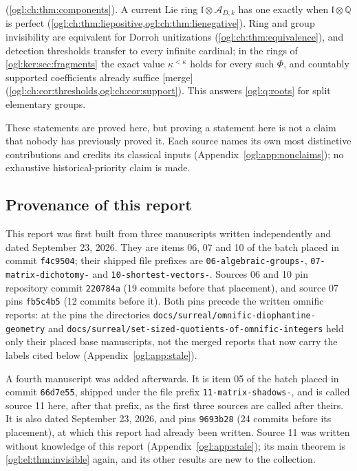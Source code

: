 \documentclass[11pt,oneside]{article}
\numberwithin{equation}{section}
\theoremstyle{definition}
\theoremstyle{remark}
\newcommand{\Q}{\mathbb Q}
\newcommand{\A}{\mathcal A}
\newcommand{\mergetag}{\textup{\textsf{\small[merge]}}}
\newcommand{\fn}[1]{\nolinkurl{#1}}
\begin{document}
\begin{enumerate}[label=\textup{(\arabic*)},leftmargin=*,itemsep=3pt]
(\cref{ogl:ch:thm:components}). A current Lie ring $\mathfrak l\otimes\A_{D,k}$
has one exactly when $\mathfrak l\otimes\Q$ is perfect
(\cref{ogl:ch:thm:liepositive,ogl:ch:thm:lienegative}). Ring and group
invisibility are equivalent for Dorroh unitizations
(\cref{ogl:ch:thm:equivalence}), and detection thresholds transfer to every
infinite cardinal; in the rings of \cref{ogl:ker:sec:fragments} the exact value
$\kappa^{<\kappa}$ holds for every such $\Phi$, and countably supported
coefficients already suffice \mergetag{}
(\cref{ogl:ch:cor:thresholds,ogl:ch:cor:support}). This answers \cref{ogl:q:roots} for split
elementary groups.
\end{enumerate}

These statements are proved here, but proving a statement here is not a claim
that nobody has previously proved it. Each source names its own most
distinctive contributions and credits its classical inputs
(Appendix~\ref{ogl:app:nonclaims}); no exhaustive historical-priority claim is made.

\subsection{Provenance of this report}\label{ogl:sub:provenance}

This report was first built from three manuscripts written independently and
dated September 23, 2026. They are items 06, 07 and 10 of the batch placed in commit
\texttt{f4c9504}; their shipped file prefixes are \fn{06-algebraic-groups-},
\fn{07-matrix-dichotomy-} and \fn{10-shortest-vectors-}. Sources 06 and 10 pin
repository commit \texttt{220784a} (19 commits before that placement), and
source 07 pins \texttt{fb5c4b5} (12 commits before it). Both pins precede the
written omnific reports: at the pins the directories
\fn{docs/surreal/omnific-diophantine-geometry} and
\fn{docs/surreal/set-sized-quotients-of-omnific-integers} held only their placed
base manuscripts, not the merged reports that now carry the labels cited below
(Appendix~\ref{ogl:app:stale}).

A fourth manuscript was added afterwards. It is item 05 of the batch placed in
commit \texttt{66d7e55}, shipped under the file prefix
\fn{11-matrix-shadows-}, and is called source 11 here, after that prefix, as
the first three sources are called after theirs. It is also dated September
23, 2026, and pins \texttt{9693b28} (24 commits before its placement), at
which this report had already been written. Source 11 was written without
knowledge of this report (Appendix~\ref{ogl:app:stale}); its main theorem is
\cref{ogl:el:thm:invisible} again, and its other results are new to the
collection.
\end{document}
